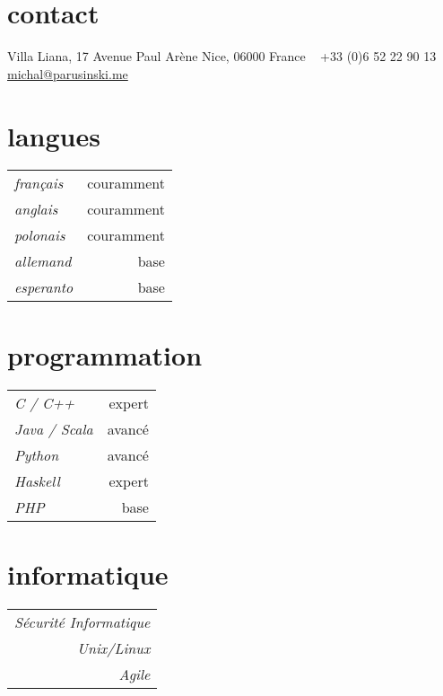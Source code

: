 \documentclass[]{friggeri-cv} %
\begin{document}


\begin{aside} %
\section{contact}
Villa Liana,
17 Avenue Paul Arène
Nice, 06000
France
~
+33 (0)6 52 22 90 13
~
\href{mailto:michal@parusinski.me}{michal@parusinski.me}
\section{langues}
    {\def\arraystretch{0.3}%
    \begin{tabular}{l r}
        \emph{français} & couramment \\
        \emph{anglais} & couramment \\
        \emph{polonais} & couramment \\
        \emph{allemand} & base \\
        \emph{esperanto} & base \\
    \end{tabular}%
    }
\section{programmation}
    {\def\arraystretch{0.3}%
    \begin{tabular}{l r}
        \emph{C / C++} & expert \\
        \emph{Java / Scala  } & avancé \\
        \emph{Python} & avancé \\
        \emph{Haskell} & expert \\
        \emph{PHP} & base \\
    \end{tabular}%
    }
\section{informatique}
    {\def\arraystretch{0.3}%
    \begin{tabular}{ r }
        \emph{Sécurité Informatique} \\
        \emph{Unix/Linux} \\
        \emph{Agile} \\
    \end{tabular}%
    }
\end{aside}
\end{document}
